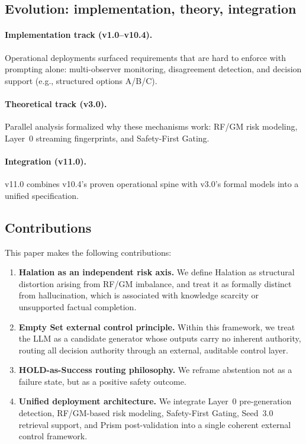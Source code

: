 \documentclass[11pt,a4paper]{article}
\begin{document}
\subsection{Evolution: implementation, theory, integration}

\paragraph{Implementation track (v1.0--v10.4).}
Operational deployments surfaced requirements that are hard to enforce with prompting alone:
multi-observer monitoring, disagreement detection, and decision support (e.g., structured
options A/B/C).

\paragraph{Theoretical track (v3.0).}
Parallel analysis formalized why these mechanisms work: RF/GM risk modeling, Layer~0
streaming fingerprints, and Safety-First Gating.

\paragraph{Integration (v11.0).}
v11.0 combines v10.4's proven operational spine with v3.0's formal models into a unified
specification.

\subsection{Contributions}
This paper makes the following contributions:
\begin{enumerate}
\item \textbf{Halation as an independent risk axis.} We define Halation as structural distortion
arising from RF/GM imbalance, and treat it as formally distinct from hallucination, which
is associated with knowledge scarcity or unsupported factual completion.

\item \textbf{Empty Set external control principle.} Within this framework, we treat the LLM as
a candidate generator whose outputs carry no inherent authority, routing all decision authority
through an external, auditable control layer.

\item \textbf{HOLD-as-Success routing philosophy.} We reframe abstention not as a failure state,
but as a positive safety outcome.

\item \textbf{Unified deployment architecture.} We integrate Layer~0 pre-generation detection,
RF/GM-based risk modeling, Safety-First Gating, Seed~3.0 retrieval support, and Prism
post-validation into a single coherent external control framework.
\end{enumerate}
\end{document}
